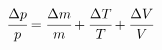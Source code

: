 \begin{align*}
    \cfrac{\Delta p}{p} &= \cfrac{\Delta m}{m} + \cfrac{\Delta T}{T} + \cfrac{\Delta V}{V}
\end{align*}
